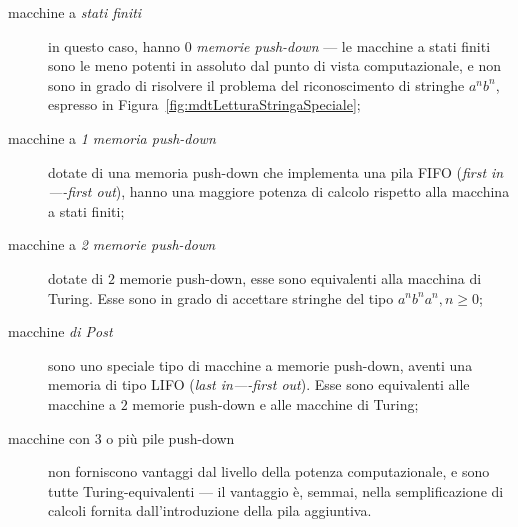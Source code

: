 \documentclass[10pt]{\classname}
\theoremstyle{newlinethm}
\theoremstyle{theorem}
\theoremstyle{definition}
\theoremstyle{definition}
\theoremstyle{definition}
\theoremstyle{definition}
\begin{document}
\begin{description}
    \item[macchine a \emph{stati finiti}] in questo caso, hanno $0$
        \emph{memorie push-down} --- le macchine a stati finiti sono le meno
        potenti in assoluto dal punto di vista computazionale, e non sono in
        grado di risolvere il problema del riconoscimento di stringhe $a^n
        b^n$, espresso in Figura~\ref{fig:mdtLetturaStringaSpeciale};
    \item[macchine a \emph{1 memoria push-down}] dotate di una memoria
        push-down che implementa una pila FIFO (\emph{first in----first out}),
        hanno una maggiore potenza di calcolo rispetto alla macchina a stati
        finiti;
    \item[macchine a \emph{2 memorie push-down}] dotate di $2$ memorie
        push-down, esse sono equivalenti alla macchina di Turing. Esse sono in grado di accettare stringhe del tipo $a^nb^na^n, n\geq 0$;
    \item[macchine \emph{di Post}] sono uno speciale tipo di macchine a memorie
        push-down, aventi una memoria di tipo LIFO (\emph{last in----first
        out}). Esse sono equivalenti alle macchine a $2$ memorie push-down e
        alle macchine di Turing;
    \item[macchine con 3 o più pile push-down] non forniscono vantaggi dal
        livello della potenza computazionale, e sono tutte Turing-equivalenti
        --- il vantaggio è, semmai, nella semplificazione di calcoli fornita
        dall'introduzione della pila aggiuntiva.
\end{description}
\end{document}
